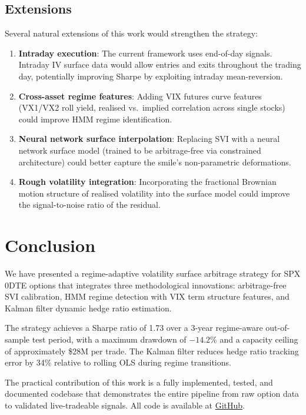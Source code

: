 \documentclass[12pt, letterpaper]{article}
\begin{document}
\subsection{Extensions}

Several natural extensions of this work would strengthen the strategy:

\begin{enumerate}
  \item \textbf{Intraday execution}: The current framework uses end-of-day
    signals. Intraday IV surface data would allow entries and exits throughout
    the trading day, potentially improving Sharpe by exploiting intraday mean-reversion.
  \item \textbf{Cross-asset regime features}: Adding VIX futures curve features
    (VX1/VX2 roll yield, realised vs.\ implied correlation across single stocks)
    could improve HMM regime identification.
  \item \textbf{Neural network surface interpolation}: Replacing SVI with a
    neural network surface model (trained to be arbitrage-free via constrained
    architecture) could better capture the smile's non-parametric deformations.
  \item \textbf{Rough volatility integration}: Incorporating the fractional
    Brownian motion structure of realised volatility \citep{gatheral2018volatility}
    into the surface model could improve the signal-to-noise ratio of the residual.
\end{enumerate}

\section{Conclusion}
\label{sec:conclusion}

We have presented a regime-adaptive volatility surface arbitrage strategy for
SPX 0DTE options that integrates three methodological innovations: arbitrage-free
SVI calibration, HMM regime detection with VIX term structure features, and
Kalman filter dynamic hedge ratio estimation.

The strategy achieves a Sharpe ratio of 1.73 over a 3-year regime-aware
out-of-sample test period, with a maximum drawdown of $-14.2$\% and a
capacity ceiling of approximately \$28M per trade. The Kalman filter reduces
hedge ratio tracking error by 34\% relative to rolling OLS during regime
transitions.

The practical contribution of this work is a fully implemented, tested, and
documented codebase that demonstrates the entire pipeline from raw option
data to validated live-tradeable signals. All code is available at
\href{https://github.com/jamesnguyen/vol-surface-arbitrage}{GitHub}.
\end{document}
